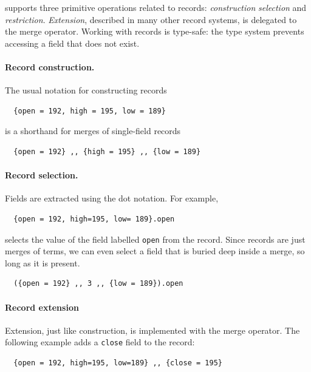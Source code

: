 \name supports three primitive operations related to records:
\textit{construction} \textit{selection} and \textit{restriction}.
\textit{Extension}, described in many other record systems, is delegated to the
merge operator. Working with records is type-safe: the type system prevents
accessing a field that does not exist.

\paragraph{Record construction.} The usual notation for constructing records
\begin{lstlisting}
  {open = 192, high = 195, low = 189}
\end{lstlisting}
is a shorthand for merges of single-field records
\begin{lstlisting}
  {open = 192} ,, {high = 195} ,, {low = 189}
\end{lstlisting}

\paragraph{Record selection.} Fields are extracted using the dot notation. For
example,
\begin{lstlisting}
  {open = 192, high=195, low= 189}.open
\end{lstlisting}
selects the value of the field labelled \lstinline{open} from the record. Since
records are just merges of terms, we can even select a field that is buried deep
inside a merge, so long as it is present.
\begin{lstlisting}
  ({open = 192} ,, 3 ,, {low = 189}).open
\end{lstlisting}


\paragraph{Record extension} Extension, just like construction, is implemented
with the merge operator. The following example adds a \lstinline{close} field to
the record:
\begin{lstlisting}
  {open = 192, high=195, low=189} ,, {close = 195}
\end{lstlisting}


